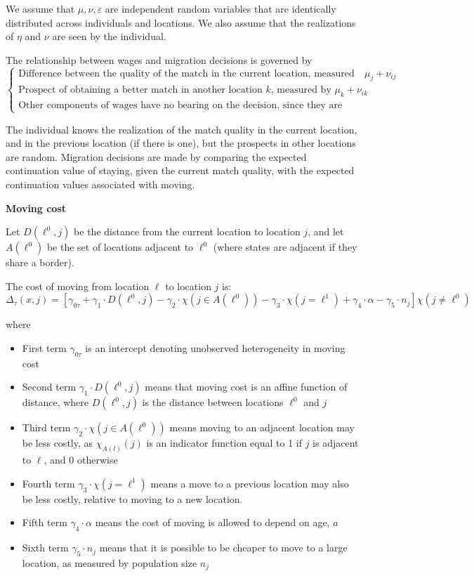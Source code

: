 \documentclass{article}
\numberwithin{equation}{section} %
\begin{document}
We assume that $\mu,\nu,\varepsilon$ are independent random variables that are identically distributed across individuals and locations. We also assume that the realizations of $\eta$ and $\nu$ are seen by the individual.


The relationship between wages and migration decisions is governed by 
$$\begin{cases}
  \text{Difference between the quality of the match in the current location, measured by }\mu_j+\nu_{ij}
  \\
  \text{Prospect of obtaining a better match in another location }k \text{, measured by }\mu_k+\nu_{ik}
  \\
  \text{Other components of wages have no bearing on the decision, since they are added to the wage no matter what}
\end{cases}$$

The individual knows the realization of the match quality in the current location, and in the previous location (if there is one), but the prospects in other locations are random. Migration decisions are made by comparing the expected continuation value of staying, given the current match quality, with the expected continuation values associated with moving.


\textbf{Moving cost}

Let $D(\ell^0,j)$ be the distance from the current location to location $j$, and let $A(\ell^0)$ be the set of locations adjacent to $\ell^0$ (where states are adjacent if they share a border).

The cost of moving from location $\ell$ to location $j$ is:
\begin{equation}
  \Delta_\tau(x, j) = [\gamma_{0 \tau}+\gamma_1 \cdot D(\ell^0,j)-\gamma_2 \cdot\chi(j\in A(\ell^0))-\gamma_3 \cdot\chi(j=\ell^1)+\gamma_4 \cdot\alpha-\gamma_5 \cdot n_j]\chi(j\neq \ell^0)
\end{equation}

where

\begin{itemize}
  \item First term $\gamma_{0 \tau}$ is an intercept denoting unobserved heterogeneity in moving cost
  \item Second term $\gamma_1 \cdot D(\ell^0,j)$ means that moving cost is an affine function of distance, where $D(\ell^0, j)$ is the distance between locations $\ell^0$ and $j$ 
  \item Third term $\gamma_2 \cdot\chi(j\in A(\ell^0))$ means moving to an adjacent location may be less costly, as $\chi_{A(l)}(j)$ is an indicator function equal to 1 if $j$ is adjacent to $\ell$, and 0 otherwise
  \item Fourth term $\gamma_3 \cdot\chi(j=\ell^1)$ means a move to a previous location may also be less costly, relative to moving to a new location.
  \item Fifth term $\gamma_4 \cdot\alpha$ means the cost of moving is allowed to depend on age, $a$
  \item Sixth term $\gamma_5 \cdot n_j$ means that it is possible to be cheaper to move to a large location, as measured by population size $n_j$
\end{itemize}
\end{document}
